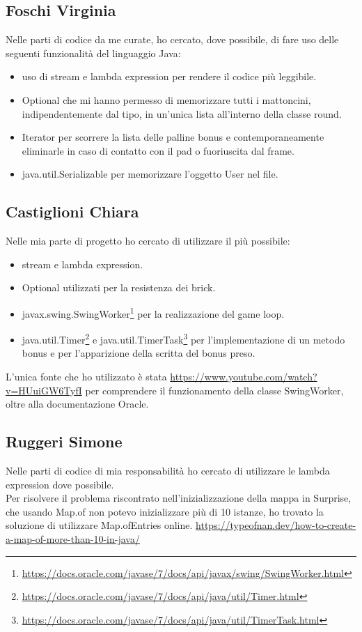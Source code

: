 \documentclass[a4paper,12pt]{report}
\begin{document}
\subsection{Foschi Virginia}
Nelle parti di codice da me curate, ho cercato, dove possibile, di fare uso delle seguenti funzionalità del linguaggio Java:
\begin{itemize}
    \item uso di stream e lambda expression per rendere il codice più leggibile.
    \item Optional che mi hanno permesso di memorizzare tutti i mattoncini, indipendentemente dal tipo, in un'unica lista all'interno della classe round.
    \item Iterator per scorrere la lista delle palline bonus e contemporaneamente eliminarle in caso di contatto con il pad o fuoriuscita dal frame.
    \item java.util.Serializable per memorizzare l'oggetto User nel file.
\end{itemize}
\subsection{Castiglioni Chiara}
Nelle mia parte di progetto ho cercato di utilizzare il più possibile:
\begin{itemize}
    \item stream e lambda expression.
    \item Optional utilizzati per la resistenza dei brick.
    \item javax.swing.SwingWorker\footnote{\url{https://docs.oracle.com/javase/7/docs/api/javax/swing/SwingWorker.html}} per la realizzazione del game loop.
    \item java.util.Timer\footnote{\url{https://docs.oracle.com/javase/7/docs/api/java/util/Timer.html}} e java.util.TimerTask\footnote{\url{https://docs.oracle.com/javase/7/docs/api/java/util/TimerTask.html}} per l'implementazione di un metodo bonus e per l'apparizione della scritta del bonus preso.
\end{itemize}

L'unica fonte che ho utilizzato è stata {\url{https://www.youtube.com/watch?v=HUuiGW6TyfI}} per comprendere il funzionamento della
classe SwingWorker, oltre alla documentazione Oracle.
\subsection{Ruggeri Simone}
Nelle parti di codice di mia responsabilità ho cercato di utilizzare le lambda expression dove possibile.\\
Per risolvere il problema riscontrato nell'inizializzazione della mappa in Surprise, che usando Map.of non potevo inizializzare più di
10 istanze, ho trovato la soluzione di utilizzare Map.ofEntries online. {\url{https://typeofnan.dev/how-to-create-a-map-of-more-than-10-in-java/}}
\end{document}
